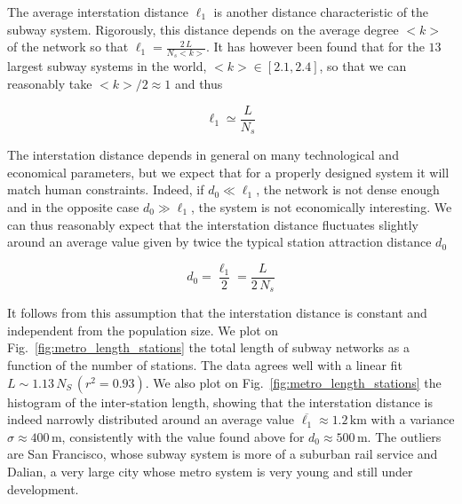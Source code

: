The average interstation distance $\ell_1$ is another distance characteristic of
the subway system. Rigorously, this distance depends on the average degree $<k>$
of the network so that $\ell_1 = \frac{2\,L}{N_s <k>}$. It has however been
found that for the $13$ largest subway systems in the world, $<k> \in
\left[2.1,2.4\right]$, so that we can reasonably take $<k> / 2 \approx 1$ and
thus

\begin{equation} 
    \ell_1 \simeq \frac{L}{N_s} 
\end{equation}

The interstation distance depends in general on many technological and
economical parameters, but we expect that for a properly designed system it will
match human constraints. Indeed, if $d_0\ll\ell_1$, the network is not dense
enough and in the opposite case $d_0\gg\ell_1$, the system is not economically
interesting. We can thus reasonably expect that the interstation distance
fluctuates slightly around an average value given by twice the typical station
attraction distance $d_0$

\begin{equation} 
    d_0 = \frac{\ell_1}{2} = \frac{L}{2\,N_s} 
\end{equation}

It follows from this assumption that the interstation distance is constant and
independent from  the population size. We plot on
Fig.~\ref{fig:metro_length_stations} the total length of subway networks as a
function of the number of stations. The data agrees well with a linear fit $L
\sim 1.13\,N_S\,(r^2=0.93)$. We also plot on
Fig.~\ref{fig:metro_length_stations} the histogram of the inter-station length,
showing that the interstation distance is indeed narrowly distributed around an
average value $\overline{\ell_1} \approx 1.2\,\text{km}$ with a variance $\sigma
\approx 400\,\text{m}$, consistently with the value found above for $d_0\approx
500\,\text{m}$. The outliers are San Francisco, whose subway system is more of a
suburban rail service and Dalian, a very large city whose metro system is very
young and still under development.


